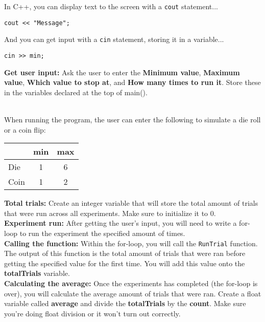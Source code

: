 \documentclass[a4paper,12pt]{book}
\begin{document}
    In C++, you can display text to the screen with a \texttt{cout} statement...

\begin{verbatim}
cout << "Message";
\end{verbatim}

    And you can get input with a \texttt{cin} statement, storing it in a variable...

\begin{verbatim}
cin >> min;
\end{verbatim}

    \textbf{Get user input:}
    Ask the user to enter the \textbf{Minimum value}, \textbf{Maximum value},
    \textbf{Which value to stop at}, and \textbf{How many times to run it}.
    Store these in the variables declared at the top of main().

    ~\\
    When running the program, the user can enter the following to
    simulate a die roll or a coin flip:

    \begin{center}
        \begin{tabular}{ l c c }
            & min & max
            \\ \hline
            Die & 1 & 6
            \\
            Coin & 1 & 2
        \end{tabular}
    \end{center}

    \newpage


    \textbf{Total trials:}
    Create an integer variable that will store
    the total amount of trials that were run across all experiments.
    Make sure to initialize it to 0.
    ~\\
    
    \textbf{Experiment run:}
    After getting the user's input, you will need to write a for-loop
    to run the experiment the specified amount of times.
    ~\\

    \textbf{Calling the function:}
    Within the for-loop, you will call the \texttt{RunTrial} function.
    The output of this function is the total amount of trials that
    were ran before getting the specified value for the first time.
    You will add this value onto the \textbf{totalTrials} variable.
    ~\\
    
    \textbf{Calculating the average:}
    Once the experiments has completed (the for-loop is over), you will
    calculate the average amount of trials that were ran.
    Create a float variable called \textbf{average} and divide
    the \textbf{totalTrials} by the \textbf{count}.
    Make sure you're doing float division or it won't turn out correctly.
\end{document}

